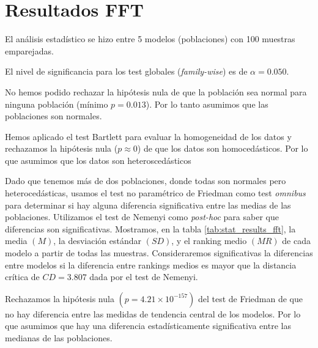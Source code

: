 \documentclass[a4paper,oneside,11pt,leqno]{article}
\begin{document}
	\section{Resultados FFT}
	\label{sec:results_fft}
	
	El análisis estadístico se hizo entre 5 modelos (poblaciones) con 100 muestras emparejadas.
	
	El nivel de significancia para los test globales (\textit{family-wise}) es de $\alpha=0.050$.
	
	No hemos podido rechazar la hipótesis nula de que la población sea normal para ninguna población (mínimo $p=0.013$). Por lo tanto asumimos que las poblaciones son normales.
	
	Hemos aplicado el test Bartlett para evaluar la homogeneidad de los datos y rechazamos la hipótesis nula ($p\approx 0$) de que los datos son homocedásticos. Por lo que asumimos que los datos son heteroscedásticos
	
	Dado que tenemos más de dos poblaciones, donde todas son normales pero heterocedásticas, usamos el test no paramétrico de Friedman como test \textit{omnibus} para determinar si hay alguna diferencia significativa entre las medias de las poblaciones. Utilizamos el test de Nemenyi como \textit{post-hoc} para saber que diferencias son significativas. Mostramos, en la tabla \ref{tab:stat_results_fft}, la media $(M)$, la desviación estándar $(SD)$, y el ranking medio $(MR)$ de cada modelo a partir de todas las muestras. Consideraremos significativas la diferencias entre modelos si la diferencia entre rankings medios es mayor que la distancia crítica de $CD=3.807$ dada por el test de Nemenyi.
	
	Rechazamos la hipótesis nula $(p=4.21\times 10^{-157})$ del test de Friedman de que no hay diferencia entre las medidas de tendencia central de los modelos. Por lo que asumimos que hay una diferencia estadísticamente significativa entre las medianas de las poblaciones.
	
\end{document}

